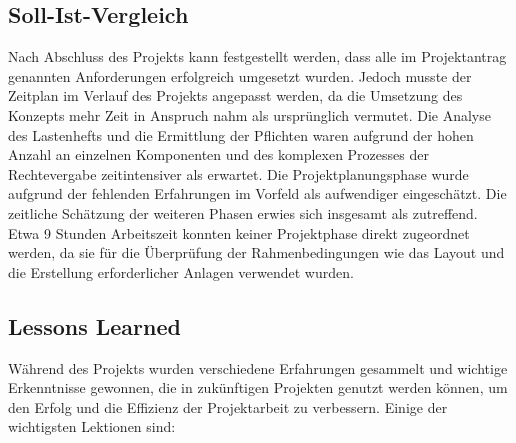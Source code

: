 \begin{flushleft}
		\subsection{Soll-\/Ist-Vergleich}
			Nach Abschluss des Projekts kann festgestellt werden, dass alle im Projektantrag genannten Anforderungen erfolgreich umgesetzt wurden.
			Jedoch musste der Zeitplan im Verlauf des Projekts angepasst werden, da die Umsetzung des Konzepts mehr Zeit in Anspruch nahm als ursprünglich vermutet.
			Die Analyse des Lastenhefts und die Ermittlung der Pflichten waren aufgrund der hohen Anzahl an einzelnen Komponenten und des komplexen Prozesses der Rechtevergabe zeitintensiver als erwartet.
			Die Projektplanungsphase wurde aufgrund der fehlenden Erfahrungen im Vorfeld als aufwendiger eingeschätzt. Die zeitliche Schätzung der weiteren Phasen erwies sich
			insgesamt als zutreffend. Etwa 9 Stunden Arbeitszeit konnten keiner Projektphase direkt zugeordnet werden, da sie für die Überprüfung der Rahmenbedingungen wie das Layout und die Erstellung erforderlicher Anlagen verwendet wurden.

		\subsection{Lessons Learned}
			Während des Projekts wurden verschiedene Erfahrungen gesammelt und wichtige Erkenntnisse gewonnen, die in zukünftigen Projekten genutzt werden können, um den Erfolg und die Effizienz der Projektarbeit zu verbessern. Einige der wichtigsten Lektionen sind:


\end{flushleft}
